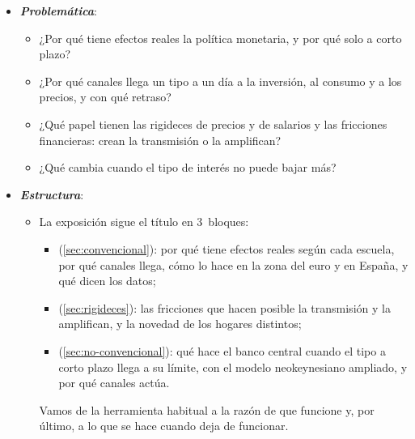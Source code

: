 \documentclass[11pt]{article}
\begin{document}
\begin{itemize}
\item \textbf{\emph{Problemática}}:
  \begin{itemize}
  \item ¿Por qué tiene efectos reales la política monetaria, y por qué solo a corto plazo?
  \item ¿Por qué canales llega un tipo a un día a la inversión, al consumo y a los precios, y con qué retraso?
  \item ¿Qué papel tienen las rigideces de precios y de salarios y las fricciones financieras: crean la transmisión o la amplifican?
  \item ¿Qué cambia cuando el tipo de interés no puede bajar más?
  \end{itemize}

\item \textbf{\emph{Estructura}}:
  \begin{itemize}
  \item La exposición sigue el título en 3~bloques:
  \begin{itemize}
  \item {} (\ref{sec:convencional}): por qué tiene efectos reales según cada escuela, por qué canales llega, cómo lo hace en la zona del euro y en España, y qué dicen los datos;
  \item {} (\ref{sec:rigideces}): las fricciones que hacen posible la transmisión y la amplifican, y la novedad de los hogares distintos;
  \item {} (\ref{sec:no-convencional}): qué hace el banco central cuando el tipo a corto plazo llega a su límite, con el modelo neokeynesiano ampliado, y por qué canales actúa.
  \end{itemize}
  Vamos de la herramienta habitual a la razón de que funcione y, por último, a lo que se hace cuando deja de funcionar.
  \end{itemize}
\end{itemize}
\end{document}
